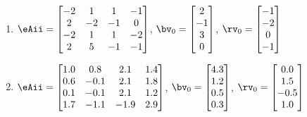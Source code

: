 \begin{exercise}
\begin{enumerate}

\item \(\eAii=\begin{bmatrix} -2&1&1&-1
\\2&-2&-1&0
\\-2&1&1&-2
\\2&5&-1&-1 \end{bmatrix}\),
\(\bv_{\arabic{enumii}}=\begin{bmatrix} 2
\\-1
\\3
\\0 \end{bmatrix}\),
\(\rv_{\arabic{enumii}}=\begin{bmatrix} -1
\\-2
\\0
\\-1 \end{bmatrix}\)

\item \(\eAii=\begin{bmatrix} 1.0&0.8&2.1&1.4
\\0.6&-0.1&2.1&1.8
\\0.1&-0.1&2.1&1.2
\\1.7&-1.1&-1.9&2.9 \end{bmatrix}\),
\(\bv_{\arabic{enumii}}=\begin{bmatrix} 4.3
\\1.2
\\0.5
\\0.3 \end{bmatrix}\),
\(\rv_{\arabic{enumii}}=\begin{bmatrix} 0.0
\\1.5
\\-0.5
\\1.0 \end{bmatrix}\)

\end{enumerate}
\end{exercise}


